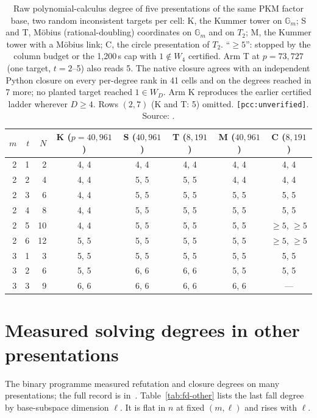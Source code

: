 \begin{table}[t]
\centering\small
\begin{tabular}{@{}rrrccccc@{}}
\toprule
$m$ & $t$ & $N$ & K ($p=40{,}961$) & S ($40{,}961$) & T ($8{,}191$) & M ($40{,}961$) & C ($8{,}191$) \\
\midrule
2 & 1 & 2 & 4, 4 & 4, 4 & 4, 4 & 4, 4 & 4, 4 \\
2 & 2 & 4 & 4, 4 & 5, 5 & 5, 5 & 4, 4 & 4, 4 \\
2 & 3 & 6 & 4, 4 & 5, 5 & 5, 5 & 5, 5 & 5, 5 \\
2 & 4 & 8 & 4, 4 & 5, 5 & 5, 5 & 5, 5 & 5, 5 \\
2 & 5 & 10 & 4, 4 & 5, 5 & 5, 5 & 5, 5 & $\ge5$, $\ge5$ \\
2 & 6 & 12 & 5, 5 & 5, 5 & 5, 5 & 5, 5 & $\ge5$, $\ge5$ \\
3 & 1 & 3 & 5, 5 & 5, 5 & 5, 5 & 5, 5 & 5, 5 \\
3 & 2 & 6 & 5, 5 & 6, 6 & 6, 6 & 5, 5 & 5, 5 \\
3 & 3 & 9 & 6, 6 & 6, 6 & 6, 6 & 6, 6 & --- \\
\bottomrule
\end{tabular}
\caption[]{Raw polynomial-calculus degree of five presentations of the
same PKM factor base, two random inconsistent targets per cell: K, the
Kummer tower on $\mathbb{G}_m$; S and T, Möbius (rational-doubling)
coordinates on $\mathbb{G}_m$ and on $T_2$; M, the Kummer tower with a
Möbius link; C, the circle presentation of $T_2$. ``$\ge5$'': stopped by the
column budget or the 1{,}200\,s cap with $1\notin W_4$ certified. Arm T at
$p=73{,}727$ (one target, $t=2$--5) also reads 5. The native closure agrees
with an independent Python closure on every per-degree rank in 41 cells
and on the degrees reached in 7 more; no planted target reached $1\in W_D$.
Arm K reproduces the earlier certified ladder wherever $D\ge4$. Rows
$(2,7)$ (K and T: 5) omitted. \texttt{[pcc:unverified]}. Source:
.}
\label{tab:fd-torus}
\end{table}

\section{Measured solving degrees in other presentations}

The binary programme measured refutation and closure degrees on many
presentations; the full record is in~\cite[\S6]{icprogram2026}.
Table~\ref{tab:fd-other} lists the last fall degree by base-subspace
dimension $\ell$. It is flat in $n$ at fixed $(m,\ell)$ and rises with
$\ell$.

